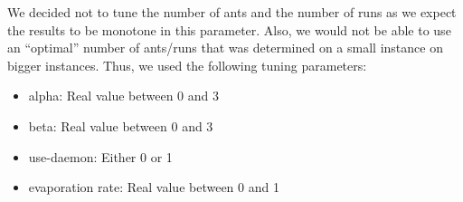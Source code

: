 \documentclass{scrartcl}
\begin{document}
We decided not to tune the number of ants and the number of runs as we
expect the results to be monotone in this parameter. Also, we would
not be able to use an ``optimal'' number of ants/runs that was
determined on a small instance on bigger instances. Thus, we used the following tuning parameters:

\begin{itemize}
  \item alpha: Real value between 0 and 3
  \item beta: Real value between 0 and 3
  \item use-daemon: Either 0 or 1
  \item evaporation rate: Real value between 0 and 1
\end{itemize}
\end{document}
